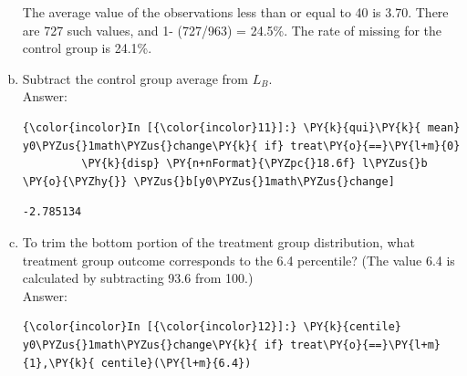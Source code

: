 \documentclass[11pt,notitlepage]{article}\usepackage[]{graphicx}\usepackage[]{color}
\makeatletter
\newenvironment{kframe}{%
 \def\at@end@of@kframe{}%
 \ifinner\ifhmode%
  \def\at@end@of@kframe{\end{minipage}}%
  \begin{minipage}{\columnwidth}%
 \fi\fi%
 \def\FrameCommand##1{\hskip\@totalleftmargin \hskip-\fboxsep
 \colorbox{shadecolor}{##1}\hskip-\fboxsep
     \hskip-\linewidth \hskip-\@totalleftmargin \hskip\columnwidth}%
 \MakeFramed {\advance\hsize-\width
   \@totalleftmargin\z@ \linewidth\hsize
   \@setminipage}}%
 {\par\unskip\endMakeFramed%
 \at@end@of@kframe}
\newenvironment{knitrout}{}{} %
\makeatother
\begin{document}
\begin{enumerate}[a)]
\begin{knitrout}
\begin{kframe}
\begin{Verbatim}[commandchars=\\\{\}]
    \end{Verbatim}

\end{kframe}
\end{knitrout}

The average value of the observations less than or equal to 40 is 3.70. There are 727 such values, and  1- (727/963) = 24.5\%. The rate of missing for the control group is 24.1\%.  


\item Subtract the control group average from $L_B$.\\
Answer:\\
\begin{knitrout}
\color{fgcolor}\begin{kframe}
    \begin{Verbatim}[commandchars=\\\{\}]
{\color{incolor}In [{\color{incolor}11}]:} \PY{k}{qui}\PY{k}{ mean} y0\PYZus{}1math\PYZus{}change\PY{k}{ if} treat\PY{o}{==}\PY{l+m}{0} 
         \PY{k}{disp} \PY{n+nFormat}{\PYZpc{}18.6f} l\PYZus{}b \PY{o}{\PYZhy{}} \PYZus{}b[y0\PYZus{}1math\PYZus{}change]
\end{Verbatim}
    \begin{Verbatim}[commandchars=\\\{\}]
         -2.785134
    \end{Verbatim}
\end{kframe}
\end{knitrout}


\item To trim the bottom portion of the treatment group distribution, what treatment group outcome corresponds to the 6.4 percentile? (The value 6.4 is calculated by subtracting 93.6 from 100.)\\
Answer:\\
\begin{knitrout}
\color{fgcolor}\begin{kframe}
    \begin{Verbatim}[commandchars=\\\{\}]
{\color{incolor}In [{\color{incolor}12}]:} \PY{k}{centile} y0\PYZus{}1math\PYZus{}change\PY{k}{ if} treat\PY{o}{==}\PY{l+m}{1},\PY{k}{ centile}(\PY{l+m}{6.4})
\end{Verbatim}

    \begin{Verbatim}[commandchars=\\\{\}]


\end{Verbatim}
\end{kframe}
\end{knitrout}
\end{enumerate}
\end{document}
